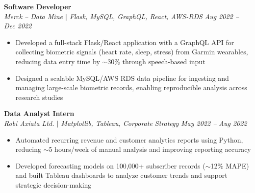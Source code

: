 \documentclass[10pt,letterpaper]{article}
\newcommand{\heading}[4]{%
  \noindent\textbf{#1} \hfill #2\\
  \textit{#3} \hfill \textit{#4}\par
}
\newcommand{\headingsimple}[2]{%
  \noindent\textbf{#1} \hfill #2\par
}
\begin{document}
\heading{Software Developer}{}{Merck -- Data Mine $|$ Flask, MySQL, GraphQL, React, AWS-RDS}{Aug 2022 -- Dec 2022}
\begin{itemize}
  \item Developed a full-stack Flask/React application with a GraphQL API for collecting biometric signals (heart rate, sleep, stress) from Garmin wearables, reducing data entry time by $\sim$30\% through speech-based input
  \item Designed a scalable MySQL/AWS RDS data pipeline for ingesting and managing large-scale biometric records, enabling reproducible analysis across research studies
\end{itemize}




\heading{Data Analyst Intern}{}{Robi Axiata Ltd. $|$ Matplotlib, Tableau, Corporate Strategy}{May 2022 -- Aug 2022} 
\begin{itemize} 
\item Automated recurring revenue and customer analytics reports using Python, reducing $\sim$5 hours/week of manual analysis and improving reporting accuracy 
\item Developed forecasting models on 100,000+ subscriber records ($\sim$12\% MAPE) and built Tableau dashboards to analyze customer trends and support strategic decision-making \end{itemize}


\end{document}
